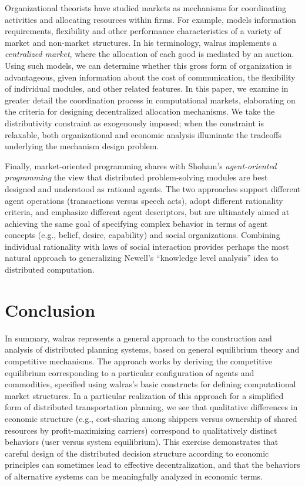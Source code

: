 Organizational theorists have studied markets as mechanisms
for coordinating activities and allocating resources within firms.
For example,  models information requirements, 
flexibility and other performance characteristics of a variety of market
and non-market structures.
In his terminology, {\sc walras} implements a {\em centralized market},
where the allocation of each good is mediated by an auction.
Using such models, we can determine whether this gross form of organization
is advantageous, given information about the cost of communication, the
flexibility of individual modules, and other related features.
In this paper, we examine in greater detail the coordination process
in computational markets, elaborating on the criteria for designing 
decentralized allocation mechanisms.
We take the distributivity constraint as exogenously imposed; when the
constraint is relaxable, both organizational and economic analysis
illuminate the tradeoffs underlying the mechanism design problem.

Finally, market-oriented programming shares with 
Shoham's
{\em agent-oriented programming\/} \cite{Shoham93} the view that distributed 
problem-solving modules are best designed and understood as 
rational agents.
The two approaches support different agent operations (transactions 
versus speech acts), adopt different rationality criteria, and emphasize
different agent descriptors, 
but are ultimately aimed at achieving the same goal of specifying complex
behavior in terms of agent concepts (e.g., belief, desire, capability)
and social organizations.
Combining individual rationality with laws of social interaction provides
perhaps the most natural approach to generalizing Newell's
``knowledge level analysis'' idea \cite{Newell82} to distributed computation.

\section{Conclusion}

In summary, {\sc walras} represents a general approach to the construction 
and analysis of distributed planning systems, based on general 
equilibrium theory and competitive mechanisms.  
The approach works by deriving the competitive equilibrium corresponding 
to a particular configuration of agents and commodities, specified using 
{\sc walras}'s basic constructs for defining computational market 
structures.
In a particular realization of this approach for a simplified form of
distributed transportation planning, we see that qualitative differences in 
economic structure (e.g., cost-sharing among shippers versus ownership of 
shared resources by profit-maximizing carriers) correspond to 
qualitatively distinct behaviors (user versus system equilibrium).
This exercise demonstrates that careful 
design of the distributed decision structure according to economic 
principles can sometimes lead to effective decentralization, and that the 
behaviors of alternative systems can be meaningfully analyzed in economic 
terms.

